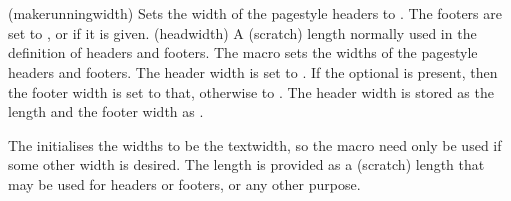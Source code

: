 \begin{syntax}
\cmd{\makerunningwidth} \\
\lnc{\headwidth} \\
\end{syntax}
\glossary(makerunningwidth)%
  {}%
  {Sets the width of the  pagestyle headers to .
   The footers are set to , or  if it
   is given.}
\glossary(headwidth)%
  {}%
  {A (scratch) length normally used in the definition of headers and footers.}
The macro \cmd{\makerunningwidth} sets the widths of the 
pagestyle headers and footers. The header
width is set to . If the optional  is
present, then the footer width is set to that, otherwise to .
The header width is stored as the length 
and the footer width as .

The \cmd{\makepagestyle} initialises the widths to be the textwidth, 
so the macro need only be used if some
other width is desired. The length \lnc{\headwidth} is provided as a
(scratch) length that may be used for headers or 
footers, or any other purpose.

